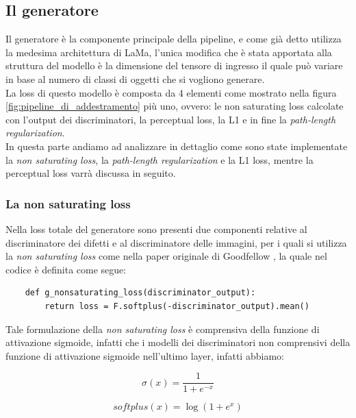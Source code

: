 \subsection{Il generatore}
Il generatore è la componente principale della pipeline, e come già detto utilizza la medesima architettura di LaMa, l'unica modifica che
è stata apportata alla struttura del modello è la dimensione del tensore di ingresso il quale può variare in base al numero di classi di oggetti che
si vogliono generare.\\
La loss di questo modello è composta da 4 elementi come mostrato nella figura \ref{fig:pipeline_di_addestramento} più uno, ovvero: le non saturating loss 
calcolate con l'output dei discriminatori, la perceptual loss, la L1 e in fine la \textit{path-length regularization}.\\
In questa parte andiamo ad analizzare in dettaglio come sono state implementate la \textit{non saturating loss}, la \textit{path-length regularization} e la L1 loss,
mentre la perceptual loss varrà discussa in seguito.

\subsubsection{La non saturating loss}
Nella loss totale del generatore sono presenti due componenti relative al discriminatore dei difetti e al discriminatore delle immagini, per i quali si utilizza la 
\textit{non saturating loss} come nella paper originale di Goodfellow \cite{goodfellow2014generative}, la quale nel codice è definita come segue:

\begin{verbatim}
    def g_nonsaturating_loss(discriminator_output):
        return loss = F.softplus(-discriminator_output).mean()
\end{verbatim}

Tale formulazione della \textit{non saturating loss} è comprensiva della funzione di attivazione sigmoide, 
infatti che i modelli dei discriminatori non comprensivi della funzione di attivazione sigmoide nell'ultimo layer, 
infatti abbiamo:

\begin{equation}
    \sigma(x) = \frac{1}{1 + e^{-x}}
    \label{eq:sigmoid}
\end{equation}

\begin{equation}
    softplus(x) = \log(1 + e^{x})
    \label{eq:softplus}
\end{equation}

